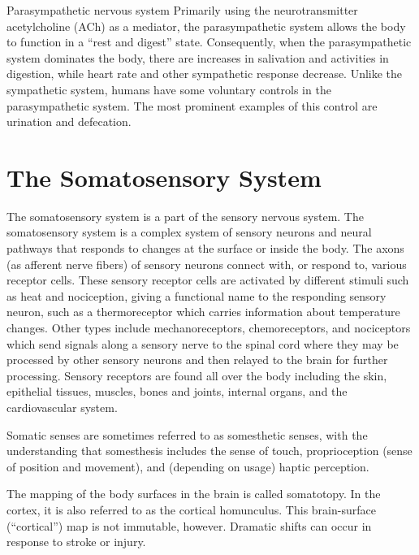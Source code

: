 \documentclass[]{book}
\begin{document}
Parasympathetic nervous system
Primarily using the neurotransmitter acetylcholine (ACh) as a mediator, the parasympathetic system allows the body to function in a ``rest and digest'' state. Consequently, when the parasympathetic system dominates the body, there are increases in salivation and activities in digestion, while heart rate and other sympathetic response decrease. Unlike the sympathetic system, humans have some voluntary controls in the parasympathetic system. The most prominent examples of this control are urination and defecation.

\hypertarget{the-somatosensory-system}{%
\chapter{The Somatosensory System}\label{the-somatosensory-system}}

The somatosensory system is a part of the sensory nervous system. The somatosensory system is a complex system of sensory neurons and neural pathways that responds to changes at the surface or inside the body. The axons (as afferent nerve fibers) of sensory neurons connect with, or respond to, various receptor cells. These sensory receptor cells are activated by different stimuli such as heat and nociception, giving a functional name to the responding sensory neuron, such as a thermoreceptor which carries information about temperature changes. Other types include mechanoreceptors, chemoreceptors, and nociceptors which send signals along a sensory nerve to the spinal cord where they may be processed by other sensory neurons and then relayed to the brain for further processing. Sensory receptors are found all over the body including the skin, epithelial tissues, muscles, bones and joints, internal organs, and the cardiovascular system.

Somatic senses are sometimes referred to as somesthetic senses, with the understanding that somesthesis includes the sense of touch, proprioception (sense of position and movement), and (depending on usage) haptic perception.

The mapping of the body surfaces in the brain is called somatotopy. In the cortex, it is also referred to as the cortical homunculus. This brain-surface (``cortical'') map is not immutable, however. Dramatic shifts can occur in response to stroke or injury.
\end{document}
